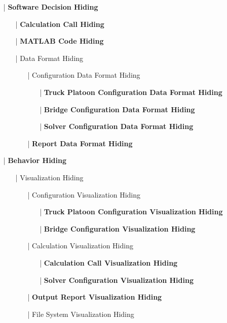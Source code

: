 \documentclass[12pt, titlepage]{article}
\begin{document}
\begin{enumerate}
    \item[|] \textbf{Software Decision Hiding}
    \begin{enumerate}
        \item[|] \textbf{Calculation Call Hiding}
        \item[|] \textbf{MATLAB Code Hiding}
        \item[|] Data Format Hiding
        \begin{enumerate}
            \item[|] Configuration Data Format Hiding
            \begin{itemize}
                \item[|] \textbf{Truck Platoon Configuration Data Format Hiding}
                \item[|] \textbf{Bridge Configuration Data Format Hiding}
                \item[|] \textbf{Solver Configuration Data Format Hiding}
            \end{itemize}
            \item[|] \textbf{Report Data Format Hiding}
        \end{enumerate}
    \end{enumerate}
    \item[|] \textbf{Behavior Hiding}
    \begin{enumerate}
        \item[|] Visualization Hiding
        \begin{enumerate}
            \item[|] Configuration Visualization Hiding
            \begin{itemize}
                \item[|] \textbf{Truck Platoon Configuration Visualization Hiding}
                \item[|] \textbf{Bridge Configuration Visualization Hiding}
            \end{itemize}
            \item[|] Calculation Visualization Hiding
            \begin{itemize}
                \item[|] \textbf{Calculation Call Visualization Hiding}
                \item[|] \textbf{Solver Configuration Visualization Hiding}
            \end{itemize}
            \item[|] \textbf{Output Report Visualization Hiding}
            \item[|] File System Visualization Hiding

\end{enumerate}
\end{enumerate}
\end{enumerate}
\end{document}
